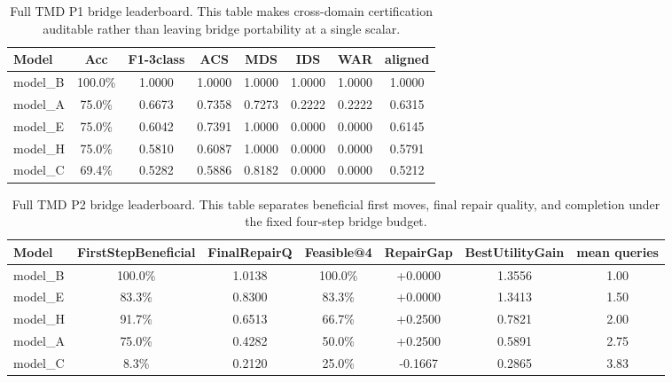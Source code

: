 \begin{table}[t]
\caption{Full TMD P1 bridge leaderboard. This table makes cross-domain certification auditable rather than leaving bridge portability at a single scalar.}
\label{tab:appendix_tmd_p1_full}
\centering
\small
\begin{tabular}{lccccccc}
\toprule
Model & Acc & F1-3class & ACS & MDS & IDS & WAR & aligned \\
\midrule
model_B & 100.0\% & 1.0000 & 1.0000 & 1.0000 & 1.0000 & 1.0000 & 1.0000 \\
model_A & 75.0\% & 0.6673 & 0.7358 & 0.7273 & 0.2222 & 0.2222 & 0.6315 \\
model_E & 75.0\% & 0.6042 & 0.7391 & 1.0000 & 0.0000 & 0.0000 & 0.6145 \\
model_H & 75.0\% & 0.5810 & 0.6087 & 1.0000 & 0.0000 & 0.0000 & 0.5791 \\
model_C & 69.4\% & 0.5282 & 0.5886 & 0.8182 & 0.0000 & 0.0000 & 0.5212 \\
\bottomrule
\end{tabular}
\end{table}

\begin{table}[t]
\caption{Full TMD P2 bridge leaderboard. This table separates beneficial first moves, final repair quality, and completion under the fixed four-step bridge budget.}
\label{tab:appendix_tmd_p2_full}
\centering
\small
\begin{tabular}{lcccccc}
\toprule
Model & FirstStepBeneficial & FinalRepairQ & Feasible@4 & RepairGap & BestUtilityGain & mean queries \\
\midrule
model_B & 100.0\% & 1.0138 & 100.0\% & +0.0000 & 1.3556 & 1.00 \\
model_E & 83.3\% & 0.8300 & 83.3\% & +0.0000 & 1.3413 & 1.50 \\
model_H & 91.7\% & 0.6513 & 66.7\% & +0.2500 & 0.7821 & 2.00 \\
model_A & 75.0\% & 0.4282 & 50.0\% & +0.2500 & 0.5891 & 2.75 \\
model_C & 8.3\% & 0.2120 & 25.0\% & -0.1667 & 0.2865 & 3.83 \\
\bottomrule
\end{tabular}
\end{table}
